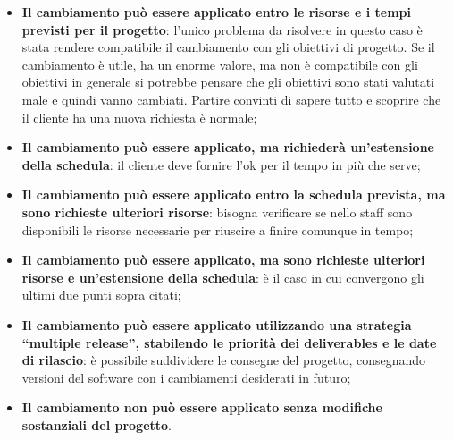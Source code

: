 \begin{itemize}
	\item \textbf{Il cambiamento può essere applicato entro le risorse e i tempi previsti per il progetto}: l'unico problema da risolvere in questo caso è stata rendere compatibile il cambiamento con gli obiettivi di progetto. Se il cambiamento è utile, ha un enorme valore, ma non è compatibile con gli obiettivi in generale si potrebbe pensare che gli obiettivi sono stati valutati male e quindi vanno cambiati. Partire convinti di sapere tutto e scoprire che il cliente ha una nuova richiesta è normale;
	\item \textbf{Il cambiamento può essere applicato, ma richiederà un’estensione della schedula}: il cliente deve fornire l'ok per il tempo in più che serve;
	\item \textbf{Il cambiamento può essere applicato entro la schedula prevista, ma sono richieste ulteriori risorse}: bisogna verificare se nello staff sono disponibili le risorse necessarie per riuscire a finire comunque in tempo;
	\item \textbf{Il cambiamento può essere applicato, ma sono richieste ulteriori risorse e un’estensione della schedula}: è il caso in cui convergono gli ultimi due punti sopra citati;
	\item \textbf{Il cambiamento può essere applicato utilizzando una strategia “multiple release”, stabilendo le priorità dei deliverables e le date di rilascio}: è possibile suddividere le consegne del progetto, consegnando versioni del software con i cambiamenti desiderati in futuro;
	\item \textbf{Il cambiamento non può essere applicato senza modifiche sostanziali del progetto}.
\end{itemize}

